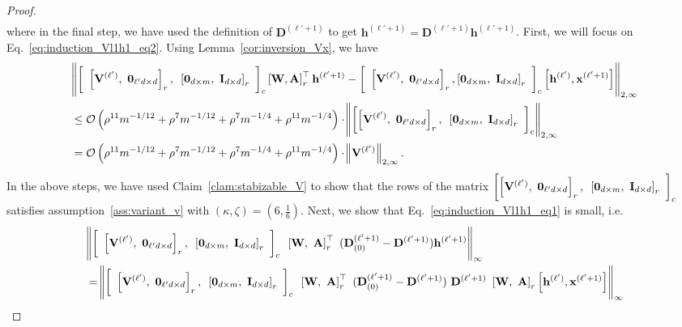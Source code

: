 \begin{proof}
\begin{align}
	\end{align}
	\endgroup
	where in the final step, we have used the definition of $\mathbf{D}^{(\ell' + 1)}$ to get $\mathbf{h}^{(\ell' + 1)} =  \mathbf{D}^{(\ell'+1)} \mathbf{h}^{(\ell' + 1)}$. First, we will focus on Eq.~\ref{eq:induction_Vl1h1_eq2}. Using Lemma~\ref{cor:inversion_Vx}, we have
	\begin{align}
		&\norm{\left[\text{ }\left[\mathbf{V}^{(\ell')}, \text{ } \mathbf{0}_{\ell'd \times d}\right]_r,\text{ } \left[\mathbf{0}_{d \times m},\text{ } \mathbf{I}_{d \times d}\right]_r\text{ }\right]_c \left[\mathbf{W},  \mathbf{A}\right]_r^{\top}   \mathbf{h}^{(\ell' + 1)} - \left[\text{ }\left[\mathbf{V}^{(\ell')}, \text{ } \mathbf{0}_{\ell'd \times d}\right]_r, \left[\mathbf{0}_{d \times m},\text{ } \mathbf{I}_{d \times d}\right]_r\text{ }\right]_c \left[\mathbf{h}^{(\ell')}, \mathbf{x}^{(\ell'+1)} \right]}_{2, \infty} \nonumber \\&
		\le   \mathcal{O}\left(\rho^{11} m^{-1/12} + \rho^{7} m^{-1/12} + \rho^{7} m^{-1/4} + \rho^{11} m^{-1/4}  \right) \cdot \norm{\left[\left[\mathbf{V}^{(\ell')}, \text{ } \mathbf{0}_{\ell'd \times d}\right]_r,\text{ } \left[\mathbf{0}_{d \times m},\text{ } \mathbf{I}_{d \times d}\right]_r\text{ }\right]_c}_{2, \infty} \nonumber\\&
		=  \mathcal{O}\left(\rho^{11} m^{-1/12} + \rho^{7} m^{-1/12} + \rho^{7} m^{-1/4} + \rho^{11} m^{-1/4}  \right)  \cdot \norm{\mathbf{V}^{(\ell')}}_{2, \infty}. \label{eq:lemma41Vl1}
	\end{align}
	In the above steps, we have used Claim~\ref{clam:stabizable_V} to show that the rows of the matrix $\left[\left[\mathbf{V}^{(\ell')}, \text{ } \mathbf{0}_{\ell'd \times d}\right]_r,\text{ } \left[\mathbf{0}_{d \times m},\text{ } \mathbf{I}_{d \times d}\right]_r\text{ }\right]_c$ satisfies assumption~\ref{ass:variant_v} with $(\kappa, \zeta)=(6, \frac{1}{6})$.
	Next, we show that Eq.~\ref{eq:induction_Vl1h1_eq1} is small, i.e.
	\begingroup \allowdisplaybreaks
	\begin{align}
		&\norm{\left[\text{ }\left[\bV^{(\ell')}, \text{ } \mathbf{0}_{\ell'd \times d}\right]_r,\text{ } \left[\mathbf{0}_{d \times m},\text{ } \mathbf{I}_{d \times d}\right]_r\text{ }\right]_c  \text{ } \left[\mathbf{W}, \text{ } \mathbf{A}\right]_r^{\top} \text{ }  (\mathbf{D}^{(\ell'+1)}_{(0)} - \mathbf{D}^{(\ell'+1)}) \mathbf{h}^{(\ell' + 1)}}_\infty \nonumber\\&= 
		\norm{\left[\text{ }\left[\bV^{(\ell')}, \text{ } \mathbf{0}_{\ell'd \times d}\right]_r,\text{ } \left[\mathbf{0}_{d \times m},\text{ } \mathbf{I}_{d \times d}\right]_r\text{ }\right]_c  \text{ } \left[\mathbf{W}, \text{ } \mathbf{A}\right]_r^{\top} \text{ } (\mathbf{D}^{(\ell'+1)}_{(0)} - \mathbf{D}^{(\ell'+1)}) \text{ } \mathbf{D}^{(\ell'+1)} \text{ } \left[\mathbf{W}, \text{ } \mathbf{A}\right]_r \left[\mathbf{h}^{(\ell')}, \mathbf{x}^{(\ell'+1)}\right] }_\infty \nonumber

\end{align}
\end{proof}
